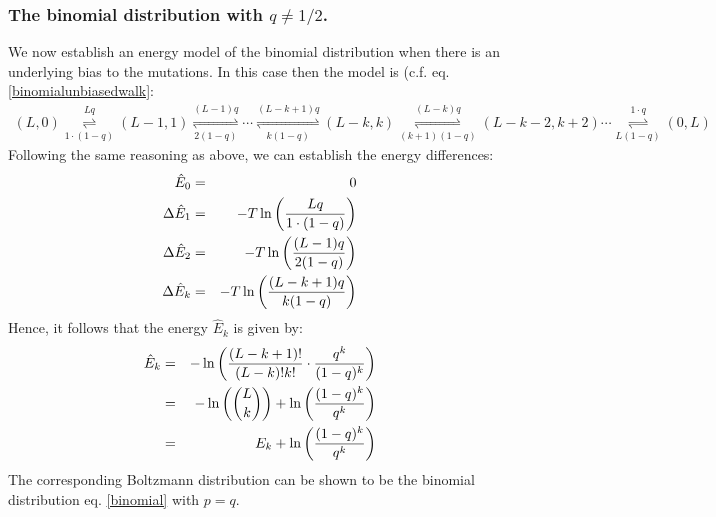 \documentclass[a4paper,10pt]{paper}%
\begin{document}
\subsubsection{The binomial distribution with $q\neq 1/2$.}
We now establish an energy model of the binomial distribution when there is an underlying bias to the mutations. In this case then the model is (c.f. eq. \ref{binomialunbiasedwalk}:
%
% 
\begin{eqnarray}
(L,0) \overset{L q}{\underset{1\cdot(1-q)}{\rightleftharpoons}} (L-1,1) \overset{(L-1)q}{\underset{2 (1-q)}{\rightleftharpoons}} \cdots   \overset{(L-k+1)q}{\underset{k(1-q)}{\rightleftharpoons}} (L-k,k) \overset{(L-k)q}{\underset{(k+1)(1-q)}{\rightleftharpoons}}  (L-k-2,k+2)\cdots  \overset{1\cdot q}{\underset{L(1-q)}{\rightleftharpoons}}  (0,L)
\end{eqnarray}
%
%
Following the same reasoning as above, we can establish the energy differences:
%
% 
\begin{eqnarray}
 \hat E_0&=& 0 \nonumber \\
 \Delta \hat E_1&=& - T\ln\left({Lq\over 1\cdot (1-q)}\right)\nonumber \\
 \Delta \hat E_2&=& - T\ln\left({(L-1)q\over 2 (1-q)}\right)\nonumber \\
 \Delta \hat E_k&=& - T\ln\left({(L-k+1)q\over k (1-q)}\right)
\end{eqnarray}
%
% 
Hence, it follows that the energy  $\hat E_k$ is given by:
%
% 
\begin{eqnarray}
\hat E_k &=& -\ln\left({(L-k+1)! \over (L-k)! k!} \cdot{q^k\over (1-q)^k} \right) \nonumber \\
 &=& -\ln\left(\binom{L}{k}  \right) + \ln\left(  {(1-q)^k\over q^k} \right)\nonumber \\
 &=&  E_k+ \ln\left(  {(1-q)^k\over q^k} \right)
\end{eqnarray}
%
% 
The corresponding Boltzmann distribution can be shown to be the binomial distribution eq. \ref{binomial} with $p=q$.  
\end{document}
